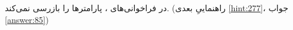 \section{}
\paragraph{}\label{hint:31}
 در فراخوانی‌های ، پارامترها را بازرسی نمی‌کند. (راهنماییِ بعدی \ref{hint:277}، جواب \ref{answer:85})